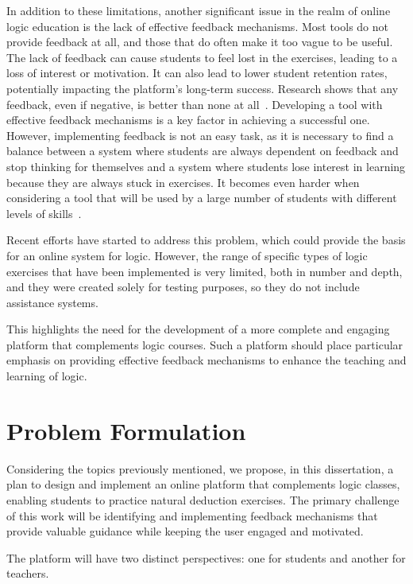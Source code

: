 In addition to these limitations, another significant issue in the realm of online logic education is the lack of effective feedback mechanisms. Most tools do not provide feedback at all, and those that do often make it too vague to be useful. The lack of feedback can cause students to feel lost in the exercises, leading to a loss of interest or motivation. It can also lead to lower student retention rates, potentially impacting the platform's long-term success. Research shows that any feedback, even if negative, is better than none at all~\cite{Zhu2022AnyFI}. Developing a tool with effective feedback mechanisms is a key factor in achieving a successful one. However, implementing feedback is not an easy task, as it is necessary to find a balance between a system where students are always dependent on feedback and stop thinking for themselves and a system where students lose interest in learning because they are always stuck in exercises. It becomes even harder when considering a tool that will be used by a large number of students with different levels of skills~\cite{Cavalcanti2019AnAO}.

Recent efforts have started to address this problem, which could provide the basis for an online system for logic. However, the range of specific types of logic exercises that have been implemented is very limited, both in number and depth, and they were created solely for testing purposes, so they do not include assistance systems.

This highlights the need for the development of a more complete and engaging platform that complements logic courses. Such a platform should place particular emphasis on providing effective feedback mechanisms to enhance the teaching and learning of logic.

\begingroup
\color{red}
\section{Problem Formulation}
\label{tab:problem_formulation}
Considering the topics previously mentioned, we propose, in this dissertation, a plan to design and implement an online platform that complements logic classes, enabling students to practice natural deduction exercises. The primary challenge of this work will be identifying and implementing feedback mechanisms that provide valuable guidance while keeping the user engaged and motivated. 

The platform will have two distinct perspectives: one for students and another for teachers.

